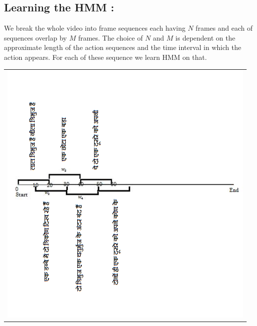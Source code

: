 \def\DevnagVersion{2.15}\documentclass[a4paper, 11pt, notitlepage]{report}
\begin{document}
\subsection{Learning the HMM :}

\begin{minipage}{0.4\textwidth}
\begin{flushleft} \large
We break the whole video into frame sequences each having $N$ frames and each of sequences overlap by $M$ frames. The choice of $N$ and $M$ is dependent on the approximate length of the action sequences and the time interval in which the action appears. For each of these sequence we learn HMM on that.

\end{flushleft}
\end{minipage}
\begin{minipage}{0.4\textwidth}
\begin{flushright} \large

\center
\begin{tabular}{c}
\includegraphics[scale=0.7]{interval1.png}
\end{tabular}
\label{tab:gt}

\end{flushright}
\end{minipage}\\[3cm]
\end{document}
